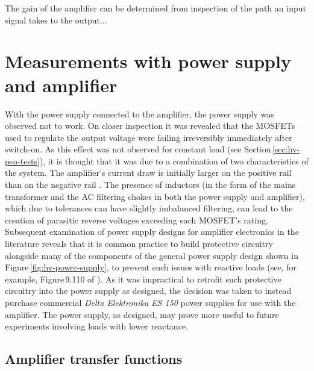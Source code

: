 
The gain of the amplifier can be determined from inspection of the path an input signal takes to the output... 

\section{\label{sec:hv-psu-amp-measurements}Measurements with power supply and amplifier}

With the power supply connected to the amplifier, the power supply was observed not to work. On closer inspection it was revealed that the \glspl{MOSFET} used to regulate the output voltage were failing irreversibly immediately after switch-on. As this effect was not observed for constant load (see Section\,\ref{sec:hv-psu-tests}), it is thought that it was due to a combination of two characteristics of the system. The amplifier's current draw is initially larger on the positive rail than on the negative rail . The presence of inductors (in the form of the mains transformer and the \gls{AC} filtering chokes in both the power supply and amplifier), which due to tolerances can have slightly imbalanced filtering, can lead to the creation of parasitic reverse voltages exceeding each \gls{MOSFET}'s rating. Subsequent examination of power supply designs for amplifier electronics in the literature reveals that it is common practice to build protective circuitry alongside many of the components of the general power supply design shown in Figure\,\ref{fig:hv-power-supply}, to prevent such issues with reactive loads (see, for example, Figure\,9.110 of \cite{Horowitz2015}). As it was impractical to retrofit such protective circuitry into the power supply as designed, the decision was taken to instead purchase commercial \emph{Delta Elektronika ES 150} power supplies for use with the amplifier. The power supply, as designed, may prove more useful to future experiments involving loads with lower reactance.

\subsection{Amplifier transfer functions}

